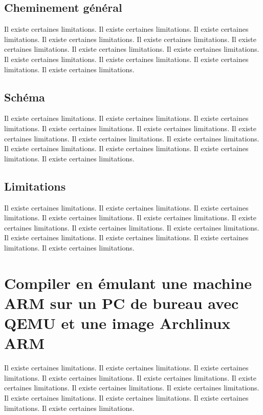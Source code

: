 \documentclass[11pt,a4paper,oneside]{report}
\begin{document}
\subsection{Cheminement général}

Il existe certaines limitations.
Il existe certaines limitations.
Il existe certaines limitations.
Il existe certaines limitations.
Il existe certaines limitations.
Il existe certaines limitations.
Il existe certaines limitations.
Il existe certaines limitations.
Il existe certaines limitations.
Il existe certaines limitations.
Il existe certaines limitations.
Il existe certaines limitations.
\subsection{Schéma}

Il existe certaines limitations.
Il existe certaines limitations.
Il existe certaines limitations.
Il existe certaines limitations.
Il existe certaines limitations.
Il existe certaines limitations.
Il existe certaines limitations.
Il existe certaines limitations.
Il existe certaines limitations.
Il existe certaines limitations.
Il existe certaines limitations.
Il existe certaines limitations.
\subsection{Limitations}

Il existe certaines limitations.
Il existe certaines limitations.
Il existe certaines limitations.
Il existe certaines limitations.
Il existe certaines limitations.
Il existe certaines limitations.
Il existe certaines limitations.
Il existe certaines limitations.
Il existe certaines limitations.
Il existe certaines limitations.
Il existe certaines limitations.
Il existe certaines limitations.


\section{Compiler en émulant une machine ARM sur un PC de bureau avec QEMU et une image Archlinux ARM}

Il existe certaines limitations.
Il existe certaines limitations.
Il existe certaines limitations.
Il existe certaines limitations.
Il existe certaines limitations.
Il existe certaines limitations.
Il existe certaines limitations.
Il existe certaines limitations.
Il existe certaines limitations.
Il existe certaines limitations.
Il existe certaines limitations.
Il existe certaines limitations.
\end{document}
